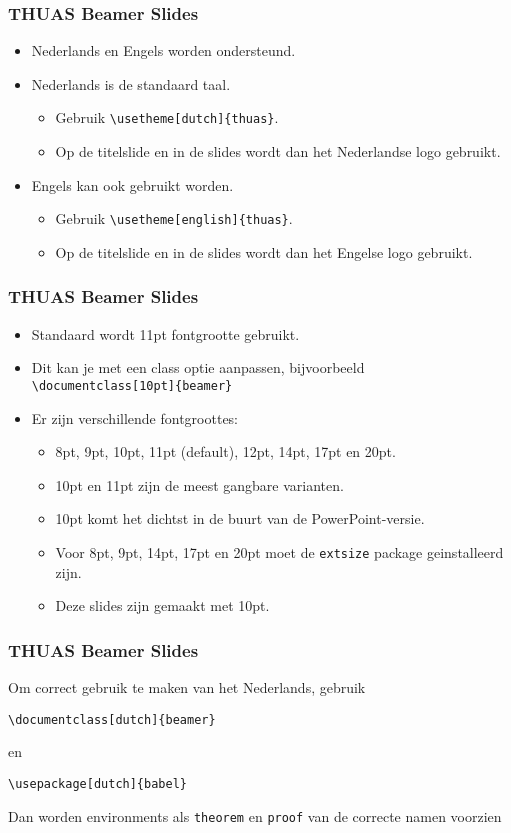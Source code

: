 \documentclass[fleqn,aspectratio=169,dutch,10pt]{beamer}
\begin{document}
\begin{frame}[fragile]
\frametitle{THUAS Beamer Slides}
\begin{itemize}
\item Nederlands en Engels worden ondersteund.
\item Nederlands is de standaard taal.
\begin{itemize}
\item Gebruik \lstinline|\usetheme[dutch]{thuas}|.
\item Op de titelslide en in de slides wordt dan het Nederlandse logo gebruikt.
\end{itemize}
\item Engels kan ook gebruikt worden.
\begin{itemize}
\item Gebruik \lstinline|\usetheme[english]{thuas}|.
\item Op de titelslide en in de slides wordt dan het Engelse logo gebruikt.
\end{itemize}
\end{itemize}
\end{frame}


\begin{frame}[fragile]
\frametitle{THUAS Beamer Slides}
\begin{itemize}
\item Standaard wordt 11pt fontgrootte gebruikt.
\item Dit kan je met een class optie aanpassen, bijvoorbeeld \lstinline|\documentclass[10pt]{beamer}|
\item Er zijn verschillende fontgroottes: 
\begin{itemize}
\item 8pt, 9pt, 10pt, 11pt (default), 12pt, 14pt, 17pt en 20pt.
\item 10pt en 11pt zijn de meest gangbare varianten.
\item 10pt komt het dichtst in de buurt van de PowerPoint-versie.
\item Voor 8pt, 9pt, 14pt, 17pt en 20pt moet de \lstinline|extsize| package geinstalleerd zijn.
\item Deze slides zijn gemaakt met 10pt.
\end{itemize}
\end{itemize}
\end{frame}


\begin{frame}[fragile]
\frametitle{THUAS Beamer Slides}
Om correct gebruik te maken van het Nederlands, gebruik
\begin{lstlisting}
\documentclass[dutch]{beamer}
\end{lstlisting}
en
\begin{lstlisting}
\usepackage[dutch]{babel}
\end{lstlisting}
Dan worden environments als \lstinline|theorem| en \lstinline|proof| van de correcte namen voorzien

\end{frame}
\end{document}
